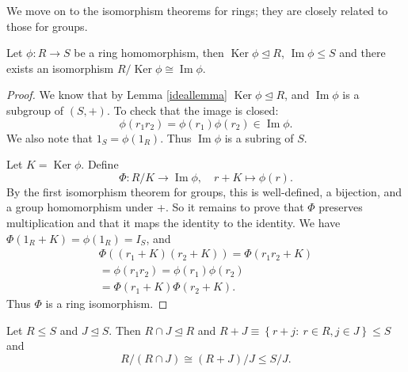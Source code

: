 \documentclass[egregdoesnotlikesansseriftitles,a4paper]{scrartcl}
\begin{document}
We move on to the isomorphism theorems for rings; they are closely related to those for groups.
\begin{theorem}
       Let $\phi : R \rightarrow S$ be a ring homomorphism, then $\operatorname{Ker}\phi \unlhd R$, $\operatorname{Im}\phi  \leq S$ and there exists an isomorphism $R/\operatorname{Ker}\phi \cong \operatorname{Im}\phi $.
\end{theorem}
\begin{proof}
       We know that by Lemma \ref{ideallemma} $\operatorname{Ker}\phi \unlhd R$, and $\operatorname{Im}\phi $ is a subgroup of $\left(S,+\right)$. To check that the image is closed: \[
       \phi \left(r_1 r_2 \right)=\phi \left(r_1 \right)\phi \left(r_2 \right)\in \operatorname{Im}\phi 
       .\] We also note that $1_{S}=\phi \left(1_{R}\right)$. Thus $\operatorname{Im}\phi $ is a subring of $S$.

       Let $K=\operatorname{Ker}\phi $. Define \[
       \Phi : R/K \rightarrow \operatorname{Im}\phi , \quad r+K \mapsto \phi \left(r\right)
       .\] By the first isomorphism theorem for groups, this is well-defined, a bijection, and a group homomorphism under +. So it remains to prove that $\Phi $ preserves multiplication and that it maps the identity to the identity. We have $\Phi \left(1_{R}+K\right)=\phi \left(1_{R}\right)=I_{S}$, and 
       \begin{align*}
             \Phi \left(\left(r_1 +K\right)\left(r_2 +K\right)\right)= \Phi \left(r_1 r_2 +K\right)\\
             =\phi \left(r_1 r_2 \right)=\phi \left(r_1\right) \phi \left(r_2 \right)\\
             = \Phi \left(r_1 +K\right)\Phi \left(r_2 +K\right).
       \end{align*}
       Thus $\Phi $ is a ring isomorphism.
\end{proof}
\begin{theorem}
       Let $R \leq S$ and $J \unlhd S$. Then $R \cap J \unlhd R$ and $R+J \equiv \left\{r+j: \ r \in R, j \in J\right\}\leq  S$ and \[
       R/\left(R \cap J\right)\cong \left(R+J\right)/J \leq S/J
       .\] 
\end{theorem}
\end{document}
